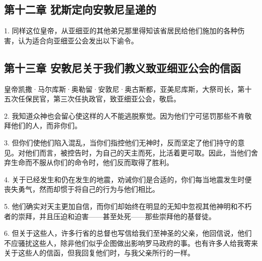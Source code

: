 
\subsection{第十二章 犹斯定向安敦尼呈递的}

1. 同样这位皇帝，从亚细亚的其他弟兄那里得知该省居民给他们施加的各种伤害，认为适合向亚细亚公会发出以下谕令。\par


\subsection{第十三章 安敦尼关于我们教义致亚细亚公会的信函}

皇帝凯撒·马尔库斯·奥勒留·安敦尼·奥古斯都，亚美尼库斯，大祭司长，第十五次任保民官，第三次任执政官，致亚细亚公会，敬启。\par

2. 我知道众神也会留心使这样的人不能逃脱察觉。因为他们宁可惩罚那些不肯敬拜他们的人，而非你们。\par

3. 但你们使他们陷入混乱，当你们指控他们无神时，反而坚定了他们持守的意见。对他们而言，被控告时，为自己的天主而死，比活着更可取。因此，当他们舍弃生命而不服从你们的命令时，他们反而取得了胜利。\par

4. 关于已经发生和仍在发生的地震，劝诫你们是合适的，你们每当地震发生时便丧失勇气，然而却惯于将自己的行为与他们相比。\par

5. 他们确实对天主更加自信，而你们却始终在明显的无知中忽视其他神明和不朽者的崇拜，并且压迫和迫害——甚至处死——那些崇拜他的基督徒。\par

6. 但关于这些人，许多行省的总督也写信给我们至神圣的父亲，他回信说，他们不应骚扰这些人，除非他们似乎企图做出影响罗马政府的事。也有许多人给我寄来关于这些人的信函，但我回复他们时，与我父亲所行的一样。\par

